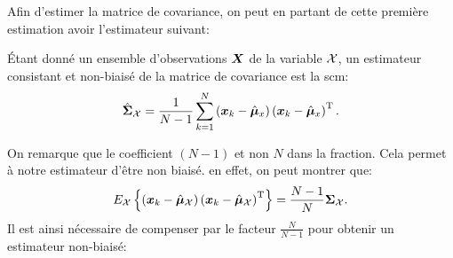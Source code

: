 Afin d'estimer la matrice de covariance, on peut en partant de cette première estimation avoir l'estimateur suivant:

\begin{proposition}
  \'Etant donné un ensemble d'observations $\boldsymbol{X}$ de la variable $\mathcal{X}$, un estimateur consistant et non-biaisé de la matrice de covariance est la scm:
  \begin{equation}
    \hat{\boldsymbol{\Sigma}}_{\mathcal{X}} =  \frac{1}{N-1}\sum_{k=1}^{N} \left(\boldsymbol{x}_k-\hat{\boldsymbol{\mu}}_x\right)\left(\boldsymbol{x}_k-\hat{\boldsymbol{\mu}}_x\right)^{\mathrm{T}}.
    \label{eq:context-estimation-covariance}
  \end{equation}
\end{proposition}


\begin{remark}
  On remarque que le coefficient $(N-1)$ et non $N$ dans la fraction. Cela permet à notre estimateur d'être non biaisé. en effet, on peut montrer que:
$$
  E_{\mathcal{X}}\left\{\left(\boldsymbol{x}_k-\hat{\boldsymbol{\mu}}_{\mathcal{X}}\right)\left(\boldsymbol{x}_k-\hat{\boldsymbol{\mu}}_{\mathcal{X}}\right)^{\mathrm{T}}\right\} = \frac{N-1}{N}\boldsymbol{\Sigma}_{\mathcal{X}}.
$$
Il est ainsi nécessaire de compenser par le facteur $\frac{N}{N-1}$ pour obtenir un estimateur non-biaisé:



\end{remark}
